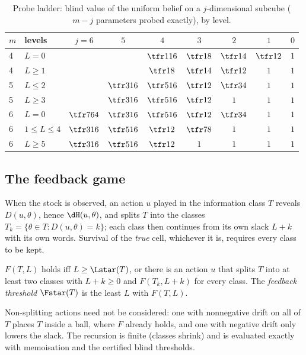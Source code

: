 \begin{table}[t]
\centering\small
\caption{Probe ladder: blind value of the uniform belief on a $j$-dimensional subcube ($m-j$ parameters probed exactly), by level.}
\label{tab:ladder}
\begin{tabular}{llccccccc}
\toprule
$m$ & levels & $j{=}6$ & $5$ & $4$ & $3$ & $2$ & $1$ & $0$\\
\midrule
4 & $L=0$ & & & $\tfr1{16}$ & $\tfr18$ & $\tfr14$ & $\tfr12$ & $1$\\
4 & $L\ge1$ & & & $\tfr18$ & $\tfr14$ & $\tfr12$ & $1$ & $1$\\
5 & $L\le2$ & & $\tfr3{16}$ & $\tfr5{16}$ & $\tfr12$ & $\tfr34$ & $1$ & $1$\\
5 & $L\ge3$ & & $\tfr3{16}$ & $\tfr5{16}$ & $\tfr12$ & $1$ & $1$ & $1$\\
6 & $L=0$ & $\tfr7{64}$ & $\tfr3{16}$ & $\tfr5{16}$ & $\tfr12$ & $\tfr34$ & $1$ & $1$\\
6 & $1\le L\le4$ & $\tfr3{16}$ & $\tfr5{16}$ & $\tfr12$ & $\tfr78$ & $1$ & $1$ & $1$\\
6 & $L\ge5$ & $\tfr3{16}$ & $\tfr5{16}$ & $\tfr12$ & $1$ & $1$ & $1$ & $1$\\
\bottomrule
\end{tabular}
\end{table}

\subsection{The feedback game}
When the stock is observed, an action $u$ played in the information class $T$ reveals $D(u,\theta)$, hence $\dH(u,\theta)$, and splits $T$ into the classes $T_k=\{\theta\in T:D(u,\theta)=k\}$; each class then continues from its own slack $L+k$ with its own words. Survival of the \emph{true} cell, whichever it is, requires every class to be kept.
\begin{definition}
$F(T,L)$ holds iff $L\ge\Lstar(T)$, or there is an action $u$ that splits $T$ into at least two classes with $L+k\ge0$ and $F(T_k,L+k)$ for every class. The \emph{feedback threshold} $\Fstar(T)$ is the least $L$ with $F(T,L)$.
\end{definition}
Non-splitting actions need not be considered: one with nonnegative drift on all of $T$ places $T$ inside a ball, where $F$ already holds, and one with negative drift only lowers the slack. The recursion is finite (classes shrink) and is evaluated exactly with memoisation and the certified blind thresholds.

